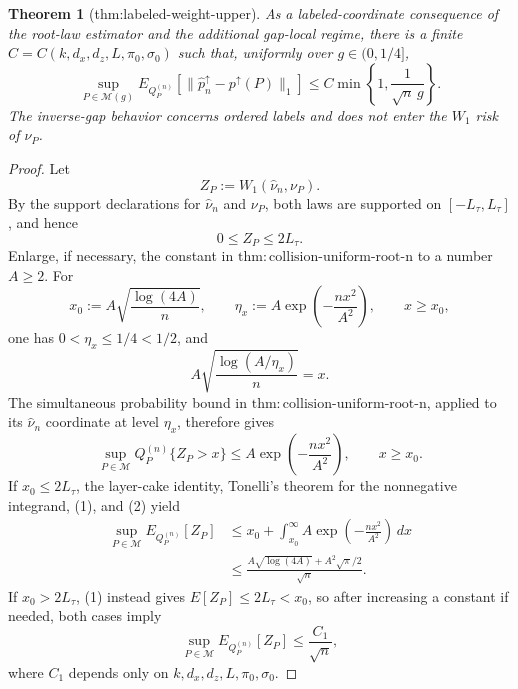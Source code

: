 \documentclass{article}
\newtheorem{theorem}{Theorem}
\begin{document}
\begin{theorem}[thm:labeled-weight-upper]\label{thm:labeled-weight-upper}
As a labeled-coordinate consequence of the root-law estimator and the additional gap-local regime, there is a finite \(C=C(k,d_x,d_z,L,\pi_0,\sigma_0)\) such that, uniformly over \(g\in(0,1/4]\), \[\sup_{P\in\mathcal M(g)}E_{Q_P^{(n)}}\!\left[\lVert\widehat p_n^{\uparrow}-p^{\uparrow}(P)\rVert_1\right]\le C\min\left\{1,\frac{1}{\sqrt n\,g}\right\}.\] The inverse-gap behavior concerns ordered labels and does not enter the \(W_1\) risk of \(\nu_P\).
\end{theorem}
\begin{proof}
Let
\[
Z_P:=W_1(\widehat\nu_n,\nu_P).
\]
By the support declarations for \(\widehat\nu_n\) and \(\nu_P\), both laws are supported on \([-L_{\tau},L_{\tau}]\), and hence
\[
0\le Z_P\le 2L_{\tau}.                                                     \tag{1}
\]
Enlarge, if necessary, the constant in \(\mathrm{thm:collision\text{-}uniform\text{-}root\text{-}n}\) to a number \(A\ge2\).  For
\[
x_0:=A\sqrt{\frac{\log(4A)}{n}},
\qquad
\eta_x:=A\exp\!\left(-\frac{nx^2}{A^2}\right),
\qquad x\ge x_0,
\]
one has \(0<\eta_x\le1/4<1/2\), and
\[
A\sqrt{\frac{\log(A/\eta_x)}{n}}=x.
\]
The simultaneous probability bound in \(\mathrm{thm:collision\text{-}uniform\text{-}root\text{-}n}\), applied to its \(\widehat\nu_n\) coordinate at level \(\eta_x\), therefore gives
\[
\sup_{P\in\mathcal M}Q_P^{(n)}\{Z_P>x\}
\le A\exp\!\left(-\frac{nx^2}{A^2}\right),
\qquad x\ge x_0.                                                            \tag{2}
\]
If \(x_0\le2L_{\tau}\), the layer-cake identity, Tonelli's theorem for the nonnegative integrand, (1), and (2) yield
\[
\begin{aligned}
\sup_{P\in\mathcal M}E_{Q_P^{(n)}}[Z_P]
&\le x_0+\int_{x_0}^{\infty}
A\exp\!\left(-\frac{nx^2}{A^2}\right)\,dx\\
&\le \frac{A\sqrt{\log(4A)}+A^2\sqrt{\pi}/2}{\sqrt n}.
\end{aligned}                                                               \tag{3}
\]
If \(x_0>2L_{\tau}\), (1) instead gives \(E[Z_P]\le2L_{\tau}<x_0\), so after increasing a constant if needed, both cases imply
\[
\sup_{P\in\mathcal M}E_{Q_P^{(n)}}[Z_P]\le\frac{C_1}{\sqrt n},             \tag{4}
\]
where \(C_1\) depends only on \(k,d_x,d_z,L,\pi_0,\sigma_0\).


\end{proof}
\end{document}

